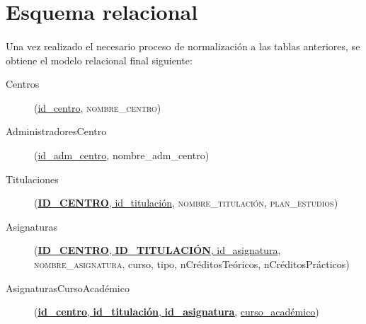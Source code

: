 \section{Esquema relacional}

  \paragraph{}Una vez realizado el necesario proceso de normalización a las
  tablas anteriores, se obtiene el modelo relacional final siguiente:

  \begin{description}
    \item[Centros] \begin{flushleft}(\underline{id\_centro},
    \textsc{nombre\_centro})\end{flushleft}
  \end{description}

  \begin{description}
    \item[AdministradoresCentro] \begin{flushleft}(\underline{id\_adm\_centro},
    nombre\_adm\_centro)\end{flushleft}
  \end{description}

  \begin{description}
    \item[Titulaciones] \begin{flushleft}(\underline{\textbf{ID\_CENTRO},
    id\_titulación}, \textsc{nombre\_titulación},
    \textsc{plan\_estudios})\end{flushleft}
  \end{description}

  \begin{description}
    \item[Asignaturas] \begin{flushleft}(\underline{\textbf{ID\_CENTRO},
    \textbf{ID\_TITULACIÓN}, id\_asignatura},
    \textsc{nombre\_asignatura}, curso, tipo, nCréditosTeóricos,
    nCréditosPrácticos)\end{flushleft}
  \end{description}

  \begin{description}
    \item[AsignaturasCursoAcadémico] \begin{flushleft}(\underline{\textbf{id\_centro},
    \textbf{id\_titulación}, \textbf{id\_asignatura},} \underline{curso\_académico})
    \end{flushleft}
  \end{description}


